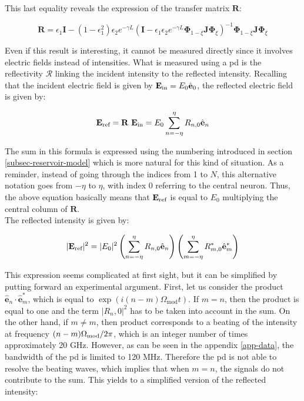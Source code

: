This last equality reveals the expression of the transfer matrix $\mathbf{R}$:

\begin{equation}
	\boxed{\mathbf{R} = \epsilon_1 \mathbf{I} - (1-\epsilon_1^2) \epsilon_2 e^{-\gamma L} \left( \mathbf{I} - \epsilon_1 \epsilon_2 e^{- \gamma L} \mathbf{\Phi}_{1-\xi} \mathbf{J} \mathbf{\Phi}_\xi \right)^{-1} \mathbf{\Phi}_{1-\xi} \mathbf{J} \mathbf{\Phi}_\xi}
\end{equation}

Even if this result is interesting, it cannot be measured directly since it involves electric fields instead of intensities. What is measured using a \gls{pd} is the reflectivity $\mathcal{R}$ linking the incident intensity to the reflected intensity. Recalling that the incident electric field is given by $\mathbf{E}_{\text{in}} = E_0 \hat{\mathbf{e}}_0$, the reflected electric field is given by:

\begin{equation}
	\mathbf{E}_{\text{ref}} = \mathbf{R}~\mathbf{E}_{\text{in}} = E_0\sum_{n=-\eta}^\eta R_{n,0} \hat{\mathbf{e}}_n
\end{equation}

The sum in this formula is expressed using the numbering introduced in section \ref{subsec-reservoir-model} which is more natural for this kind of situation. As a reminder, instead of going through the indices from 1 to $N$, this alternative notation goes from $-\eta$ to $\eta$, with index 0 referring to the central neuron. Thus, the above equation basically means that $\mathbf{E}_{\text{ref}}$ is equal to $E_0$ multiplying the central column of $\mathbf{R}$.\\

The reflected intensity is given by:

\begin{equation}
	|\mathbf{E}_{\text{ref}}|^2 = |E_0|^2 \left(\sum_{n=-\eta}^\eta R_{n,0} \hat{\mathbf{e}}_n \right) \left(\sum_{m=-\eta}^\eta R_{m,0}^* \hat{\mathbf{e}}_m^* \right)
\end{equation}

This expression seems complicated at first sight, but it can be simplified by putting forward an experimental argument. First, let us consider the product $\hat{\mathbf{e}}_n \cdot \hat{\mathbf{e}}_m^*$, which is equal to $\exp{(i(n-m)\Omega_{\text{mod}}t)}$. If $m=n$, then the product is equal to one and the term $|R_n,0|^2$ has to be taken into account in the sum. On the other hand, if $m\neq m$, then product corresponds to a beating of the intensity at frequency $(n-m)\Omega_{\text{mod}}/2\pi$, which is an integer number of times approximately 20 GHz. However, as can be seen in the appendix \ref{app-data}, the bandwidth of the \gls{pd} is limited to 120 MHz. Therefore the \gls{pd} is not able to resolve the beating waves, which implies that when $m=n$, the signals do not contribute to the sum. This yields to a simplified version of the reflected intensity:

